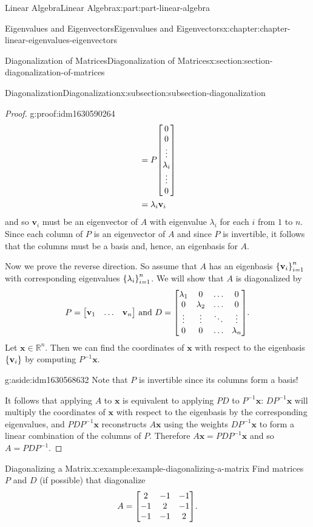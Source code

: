 \documentclass[twoside,10pt,]{book}
\numberwithin{equation}{part}
\newcommand{\RR}{\mathbb{R}}
\newcommand{\xx}{\mathbf{x}}
\newcommand{\vv}{\mathbf{v}}
\begin{document}
\begin{partptx}{Linear Algebra}{}{Linear Algebra}{}{}{x:part:part-linear-algebra}
\begin{chapterptx}{Eigenvalues and Eigenvectors}{}{Eigenvalues and Eigenvectors}{}{}{x:chapter:chapter-linear-eigenvalues-eigenvectors}
\begin{sectionptx}{Diagonalization of Matrices}{}{Diagonalization of Matrices}{}{}{x:section:section-diagonalization-of-matrices}
\begin{subsectionptx}{Diagonalization}{}{Diagonalization}{}{}{x:subsection:subsection-diagonalization}
\begin{proof}{}{g:proof:idm1630590264}
\begin{align*}
& = P\mqty[0\\0\\\vdots\\\lambda_i\\\vdots\\0] \\
& = \lambda_i\vv_i 
\end{align*}
and so \(\vv_i\) must be an eigenvector of \(A\) with eigenvalue \(\lambda_i\) for each \(i\) from \(1\) to \(n\). Since each column of \(P\) is an eigenvector of \(A\) and since \(P\) is invertible, it follows that the columns must be a basis and, hence, an eigenbasis for \(A\).%
\par
Now we prove the reverse direction. So assume that \(A\) has an eigenbasis \(\qty{\vv_i}_{i=1}^n\) with corresponding eigenvalues \(\qty{\lambda_i}_{i=1}^n\). We will show that \(A\) is diagonalized by%
\begin{equation*}
P = \mqty[\vv_1&\ldots&\vv_n]\text{ and }D = \mqty[\lambda_1 & 0 & \ldots & 0 \\ 0 & \lambda_2 & \ldots & 0 \\ \vdots & \vdots & \ddots & \vdots \\ 0 & 0 & \ldots & \lambda_n]\text{.}
\end{equation*}
Let \(\xx\in\RR^n\). Then we can find the coordinates of \(\xx\) with respect to the eigenbasis \(\qty{\vv_i}\) by computing \(P^{-1}\xx\). \begin{aside}{}{g:aside:idm1630568632}%
Note that \(P\) is invertible since its columns form a basis!%
\end{aside}
 It follows that applying \(A\) to \(\xx\) is equivalent to applying \(PD\) to \(P^{-1}\xx\): \(DP^{-1}\xx\) will multiply the coordinates of \(\xx\) with respect to the eigenbasis by the corresponding eigenvalues, and \(PDP^{-1}\xx\) reconstructs \(A\xx\) using the weights \(DP^{-1}\xx\) to form a linear combination of the columns of \(P\). Therefore \(A\xx=PDP^{-1}\xx\) and so \(A = PDP^{-1}\).%
\end{proof}
\begin{example}{Diagonalizing a Matrix.}{x:example:example-diagonalizing-a-matrix}%
Find matrices \(P\) and \(D\) (if possible) that diagonalize%
\begin{equation*}
A = \mqty[2 & -1 & -1 \\ -1 & 2 & -1 \\ -1 & -1 & 2]\text{.}
\end{equation*}
%
\par\smallskip%

\end{example}
\end{subsectionptx}
\end{sectionptx}
\end{chapterptx}
\end{partptx}
\end{document}
